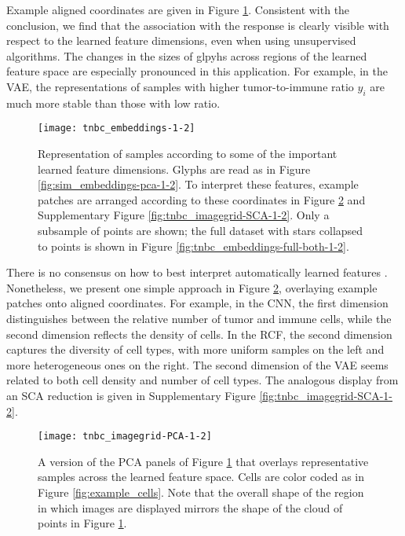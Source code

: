 Example aligned coordinates are given in Figure
\ref{fig:tnbc_embeddings-1-2}. Consistent with the conclusion, we find that
the association with the response is clearly visible with respect to the learned
feature dimensions, even when using unsupervised algorithms. The changes in the
sizes of glpyhs across regions of the learned feature space are especially
pronounced in this application. For example, in the VAE, the representations of
samples with higher tumor-to-immune ratio $y_i$ are much more stable than those
with low ratio.

\begin{figure}
  \centering
  \texttt{[image: tnbc\_embeddings-1-2]}
  \caption{Representation of samples according to some of the important learned
    feature dimensions. Glyphs are read as in Figure
    \ref{fig:sim_embeddings-pca-1-2}. To interpret these features, example
    patches are arranged according to these coordinates in Figure
    \ref{fig:tnbc_imagegrid-PCA-1-2} and Supplementary Figure
    \ref{fig:tnbc_imagegrid-SCA-1-2}. Only a subsample of points are shown; the
    full dataset with stars collapsed to points is shown in Figure
    \ref{fig:tnbc_embeddings-full-both-1-2}.}
  \label{fig:tnbc_embeddings-1-2}
\end{figure}

There is no consensus on how to best interpret automatically learned features
\citep{doshi2017towards}. Nonetheless, we present one simple approach in Figure
\ref{fig:tnbc_imagegrid-PCA-1-2}, overlaying example patches onto aligned
coordinates. For example, in the CNN, the first dimension distinguishes between
the relative number of tumor and immune cells, while the second dimension
reflects the density of cells. In the RCF, the second dimension captures the
diversity of cell types, with more uniform samples on the left and more
heterogeneous ones on the right. The second dimension of the VAE seems related
to both cell density and number of cell types. The analogous display from an SCA
reduction is given in Supplementary Figure \ref{fig:tnbc_imagegrid-SCA-1-2}.

\begin{figure}
  \centering
  \texttt{[image: tnbc\_imagegrid-PCA-1-2]}
  \caption{A version of the PCA panels of Figure \ref{fig:tnbc_embeddings-1-2}
    that overlays representative samples across the learned feature space. Cells
    are color coded as in Figure \ref{fig:example_cells}. Note that the overall
    shape of the region in which images are displayed mirrors the shape of the
    cloud of points in Figure \ref{fig:tnbc_embeddings-1-2}.}
  \label{fig:tnbc_imagegrid-PCA-1-2}
\end{figure}
